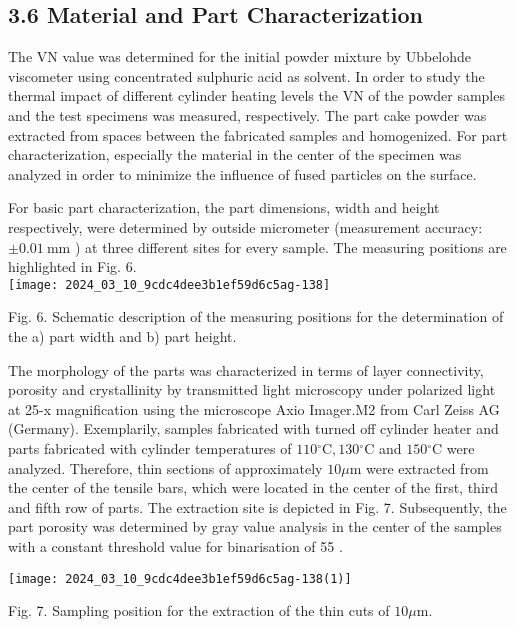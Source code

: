 \documentclass[10pt]{article}
\begin{document}
\subsection*{3.6 Material and Part Characterization}
The VN value was determined for the initial powder mixture by Ubbelohde viscometer using concentrated sulphuric acid as solvent. In order to study the thermal impact of different cylinder heating levels the VN of the powder samples and the test specimens was measured, respectively. The part cake powder was extracted from spaces between the fabricated samples and homogenized. For part characterization, especially the material in the center of the specimen was analyzed in order to minimize the influence of fused particles on the surface.

For basic part characterization, the part dimensions, width and height respectively, were determined by outside micrometer (measurement accuracy: $\pm 0.01 \mathrm{~mm}$ ) at three different sites for every sample. The measuring positions are highlighted in Fig. 6.\\
\texttt{[image: 2024\_03\_10\_9cdc4dee3b1ef59d6c5ag-138]}

Fig. 6. Schematic description of the measuring positions for the determination of the a) part width and b) part height.

The morphology of the parts was characterized in terms of layer connectivity, porosity and crystallinity by transmitted light microscopy under polarized light at 25-x magnification using the microscope Axio Imager.M2 from Carl Zeiss AG (Germany). Exemplarily, samples fabricated with turned off cylinder heater and parts fabricated with cylinder temperatures of $110{ }^{\circ} \mathrm{C}, 130{ }^{\circ} \mathrm{C}$ and $150{ }^{\circ} \mathrm{C}$ were analyzed. Therefore, thin sections of approximately $10 \mu \mathrm{m}$ were extracted from the center of the tensile bars, which were located in the center of the first, third and fifth row of parts. The extraction site is depicted in Fig. 7. Subsequently, the part porosity was determined by gray value analysis in the center of the samples with a constant threshold value for binarisation of 55 .

\begin{center}
\texttt{[image: 2024\_03\_10\_9cdc4dee3b1ef59d6c5ag-138(1)]}
\end{center}

Fig. 7. Sampling position for the extraction of the thin cuts of $10 \mu \mathrm{m}$.
\end{document}
